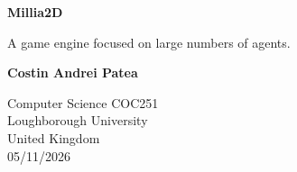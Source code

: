 \begin{titlepage}
    \begin{center}
        \vspace*{1cm}

        \Huge
        \textbf{Millia2D}

        \vspace{0.5cm}
        \LARGE
        A game engine focused on large numbers of agents.

        \vspace{1.5cm}

        \textbf{Costin Andrei Patea}

        \vfill

        \vspace{0.8cm}

        \Large
        Computer Science COC251\\
        Loughborough University\\
        United Kingdom\\
        05/11/2026
    \end{center}
\end{titlepage}